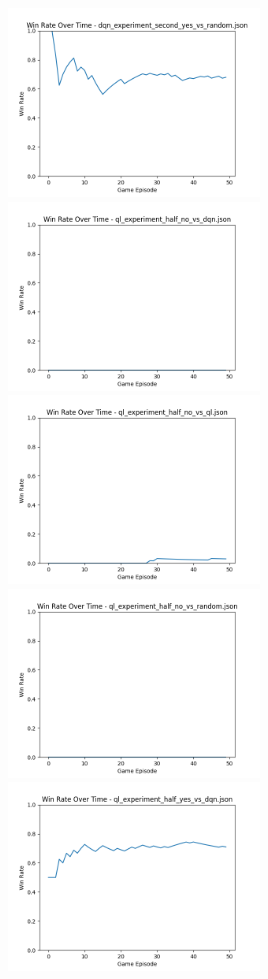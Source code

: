 \includegraphics[width=0.5\textwidth]{images/win_rate_dqn_experiment_second_yes_vs_random.png} 
\includegraphics[width=0.5\textwidth]{images/win_rate_ql_experiment_half_no_vs_dqn.png} 
\includegraphics[width=0.5\textwidth]{images/win_rate_ql_experiment_half_no_vs_ql.png} 
\includegraphics[width=0.5\textwidth]{images/win_rate_ql_experiment_half_no_vs_random.png} 
\includegraphics[width=0.5\textwidth]{images/win_rate_ql_experiment_half_yes_vs_dqn.png} 

